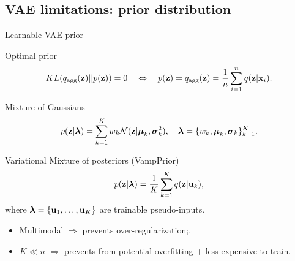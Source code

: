 \subsection{VAE limitations: prior distribution}
\begin{frame}{Learnable VAE prior}
	\begin{block}{Optimal prior}
		\vspace{-0.7cm}
		\[
			KL(q_{\text{agg}}(\mathbf{z}) || p(\mathbf{z})) = 0 \quad \Leftrightarrow \quad p (\mathbf{z}) = q_{\text{agg}}(\mathbf{z}) = \frac{1}{n} \sum_{i=1}^n q(\mathbf{z} | \mathbf{x}_i).
		\]
		\vspace{-0.6cm}
	\end{block}
	\begin{block}{Mixture of Gaussians}
		\vspace{-0.3cm}
		\[
			p(\mathbf{z} | \boldsymbol{\lambda}) = \sum_{k=1}^K w_k \mathcal{N}(\mathbf{z} | \boldsymbol{\mu}_k, \boldsymbol{\sigma}_k^2), \quad \boldsymbol{\lambda} = \{w_k, \boldsymbol{\mu}_k, \boldsymbol{\sigma}_k\}_{k=1}^K.
		\]
		\vspace{-0.5cm}
	\end{block}
	\begin{block}{Variational Mixture of posteriors (VampPrior)}
		\vspace{-0.3cm}
		\[
		p(\mathbf{z} | \boldsymbol{\lambda}) = \frac{1}{K} \sum_{k=1}^K q(\mathbf{z} | \mathbf{u}_k),
		\]
		where $\boldsymbol{\lambda} = \{\mathbf{u}_1, \dots, \mathbf{u}_K\}$ are trainable pseudo-inputs.
	\end{block}
	\begin{itemize}
		\item Multimodal $\Rightarrow$ prevents over-regularization;.
		\item $K \ll n$ $\Rightarrow$ prevents from potential overfitting + less expensive to train.
	\end{itemize}
\end{frame}
